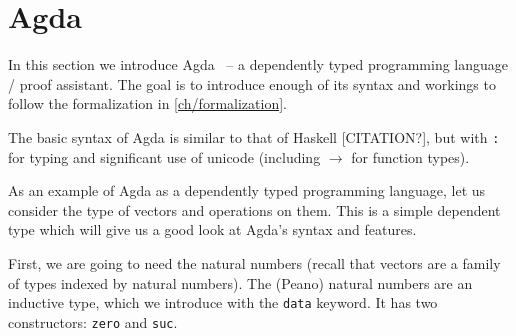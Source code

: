 \section{Agda}
In this section we introduce Agda~\cite{Agda} -- a dependently typed programming language / proof assistant.
The goal is to introduce enough of its syntax and workings to follow the formalization in \autoref{ch/formalization}.

The basic syntax of Agda is similar to that of Haskell [CITATION?], but with \texttt{:} for typing and significant use of unicode (including $\rightarrow$ for function types).

As an example of Agda as a dependently typed programming language,
let us consider the type of vectors and operations on them.
This is a simple dependent type which will give us a good look at Agda's syntax and features.

First, we are going to need the natural numbers (recall that vectors are a family of types indexed by natural numbers).
The (Peano) natural numbers are an inductive type, which we introduce with the \texttt{data} keyword.
It has two constructors: \texttt{zero} and \texttt{suc}.
\begin{code}%
\>[0]\AgdaSpace{}%
\AgdaSpace{}%
\AgdaSymbol{:}\AgdaSpace{}%
\AgdaSpace{}%
\<%
\\
\>[0][@{}l@{\AgdaIndent{0}}]%
\>[2]\AgdaSpace{}%
\AgdaSymbol{:}\AgdaSpace{}%
\<%
\\
%
\>[2]\AgdaSpace{}%
\AgdaSymbol{:}\AgdaSpace{}%
\AgdaSpace{}%
\AgdaSpace{}%
\<%
\end{code}
\begin{code}[hide]%
\>[0]\AgdaOperator{\AgdaFunction{\AgdaUnderscore{}+\AgdaUnderscore{}}}\AgdaSpace{}%
\AgdaSymbol{:}\AgdaSpace{}%
\AgdaSpace{}%
\AgdaSpace{}%
\AgdaSpace{}%
\AgdaSpace{}%
\<%
\\
\>[0]\AgdaSpace{}%
\AgdaOperator{\AgdaFunction{+}}\AgdaSpace{}%
\AgdaSpace{}%
\AgdaSymbol{=}\AgdaSpace{}%
\<%
\\
\>[0]\AgdaSpace{}%
\AgdaSpace{}%
\AgdaOperator{\AgdaFunction{+}}\AgdaSpace{}%
\AgdaSpace{}%
\AgdaSymbol{=}\AgdaSpace{}%
\AgdaSpace{}%
\AgdaSymbol{(}\AgdaSpace{}%
\AgdaOperator{\AgdaFunction{+}}\AgdaSpace{}%
\AgdaSymbol{)}\<%
\\
%
\\[\AgdaEmptyExtraSkip]%
\>[0]\AgdaSpace{}%
\AgdaSpace{}%
\<%
\end{code}

